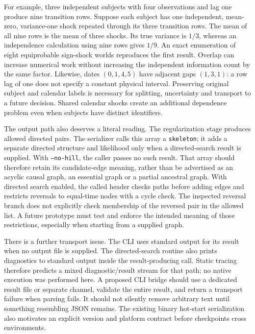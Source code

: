 For example, three independent subjects with four observations and lag one
produce nine transition rows. Suppose each subject has one independent,
mean-zero, variance-one shock repeated through its three transition rows.
The mean of all nine rows is the mean of three shocks. Its true variance is
$1/3$, whereas an independence calculation using nine rows gives $1/9$.
An exact enumeration of eight equiprobable sign-shock worlds reproduces the
first result. Overlap can increase numerical work without increasing the
independent information count by the same factor. Likewise, dates
$(0,1,4,5)$ have adjacent gaps $(1,3,1)$: a row lag of one does not specify a
constant physical interval. Preserving original subject and calendar labels
is necessary for splitting, uncertainty and transport to a future decision.
Shared calendar shocks create an additional dependence problem even when
subjects have distinct identifiers. \citep{exec16_ct_oracle}

The output path also deserves a literal reading. The regularization stage
produces allowed directed pairs. The serializer calls this array a
\texttt{skeleton}; it adds a separate directed structure and likelihood only
when a directed-search result is supplied. With \texttt{--no-hill}, the caller
passes no such result. That array should therefore retain its candidate-edge
meaning, rather than be advertised as an acyclic causal graph, an essential
graph or a partial ancestral graph. With directed search enabled, the called
header checks paths before adding edges and restricts reversals to equal-time
nodes with a cycle check. The inspected reversal branch does not explicitly
check membership of the reversed pair in the allowed list. A future prototype
must test and enforce the intended meaning of those restrictions, especially
when starting from a supplied graph. \citep{exec16_ct_sdbn}

There is a further transport issue. The CLI uses standard output for its result
when no output file is supplied. The directed-search routine also prints
diagnostics to standard output inside the result-producing call. Static tracing
therefore predicts a mixed diagnostic/result stream for that path; no native
execution was performed here. A proposed CLI bridge should use a dedicated
result file or separate channel, validate the entire result, and return a
transport failure when parsing fails. It should not silently remove arbitrary
text until something resembling JSON remains. The existing binary hot-start
serialization also motivates an explicit version and platform contract before
checkpoints cross environments. \citep{exec16_ct_sdbn,exec16_ct_design}

